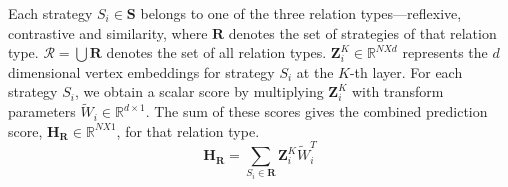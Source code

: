 \vspace{0.1in}
\noindent
Each strategy $S_i \in \mathbf{S}$ belongs to one of the three relation types---reflexive, contrastive and similarity, where $\mathbf{R}$ denotes the set of strategies of that relation type. $\mathcal{R} = \bigcup \mathbf{R}$ denotes the set of all relation types.
$\mathbf{Z}_i^K \in \mathbb{R}^{N X d}$ represents the $d$ dimensional vertex embeddings for strategy $S_i$ at the $K$-th layer. For each strategy $S_i$, we obtain a scalar score by multiplying $\mathbf{Z}_i^K$ with transform parameters $\widetilde{W}_i \in \mathbb{R}^{d \times 1}$.
The sum of these scores gives the combined prediction score, $\mathbf{H}_{\mathbf{R}} \in \mathbb{R}^{N X 1}$, for that relation type.
\begin{equation}
    \label{eq:score}
        \mathbf{H}_{\mathbf{R}} = \sum_{S_i \in \mathbf{R}} \mathbf{Z}_i^K \widetilde{W}_i^T
\end{equation}

